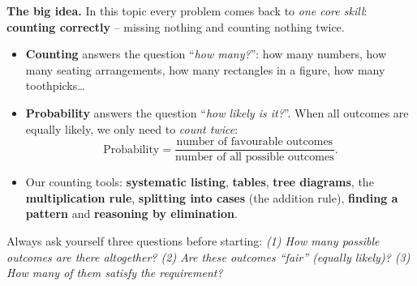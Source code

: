 \documentclass[11pt]{article}
\begin{document}
\providecommand{\cpSpinSix}[6]{%
  \foreach \a in {90,150,210,270,330,30}{\draw[Ink,line width=0.8pt] (0,0)--(\a:1.1);}
  \draw[Ink,line width=1pt] (0,0) circle (1.1);
  \node[font=\itshape\large] at (120:0.72){#1};
  \node[font=\itshape\large] at (60:0.72){#2};
  \node[font=\itshape\large] at (0:0.72){#3};
  \node[font=\itshape\large] at (-60:0.72){#4};
  \node[font=\itshape\large] at (-120:0.72){#5};
  \node[font=\itshape\large] at (180:0.72){#6};
  \draw[-{Stealth[length=7pt]},line width=1.6pt,Ink] (0,0)--(250:0.98);
  \fill[Ink] (0,0) circle (1.6pt);}
\providecommand{\cpOct}[2]{%
  \draw[Ink,line width=0.8pt,fill=tmBlue!8] (#1-0.2071,#2+0.5)--(#1+0.2071,#2+0.5)--(#1+0.5,#2+0.2071)--(#1+0.5,#2-0.2071)
     --(#1+0.2071,#2-0.5)--(#1-0.2071,#2-0.5)--(#1-0.5,#2-0.2071)--(#1-0.5,#2+0.2071)--cycle;}
\providecommand{\cpDia}[2]{%
  \draw[Ink,line width=0.8pt,fill=tmOrange!35] (#1,#2+0.2929)--(#1+0.2929,#2)--(#1,#2-0.2929)--(#1-0.2929,#2)--cycle;}
\providecommand{\rvcaBall}[3]{\filldraw[fill=#3!55,draw=#3!75!black,line width=0.7pt] (#1,#2) circle (0.22);}


\begin{knowbox}
\textbf{The big idea.} In this topic every problem comes back to \emph{one core skill}: \textbf{counting correctly} -- missing nothing and counting nothing twice.
\begin{itemize}[leftmargin=1.2em,itemsep=1pt,topsep=2pt]
\item \textbf{Counting} answers the question ``\emph{how many?}'': how many numbers, how many seating arrangements, how many rectangles in a figure, how many toothpicks\ldots
\item \textbf{Probability} answers the question ``\emph{how likely is it?}''. When all outcomes are equally likely, we only need to \emph{count twice}:
\[
\text{Probability}=\frac{\text{number of favourable outcomes}}{\text{number of all possible outcomes}} .
\]
\item Our counting tools: \textbf{systematic listing}, \textbf{tables}, \textbf{tree diagrams}, the \textbf{multiplication rule}, \textbf{splitting into cases} (the addition rule), \textbf{finding a pattern} and \textbf{reasoning by elimination}.
\end{itemize}
Always ask yourself three questions before starting: \emph{(1) How many possible outcomes are there altogether? (2) Are these outcomes ``fair'' (equally likely)? (3) How many of them satisfy the requirement?}
\end{knowbox}
\end{document}
